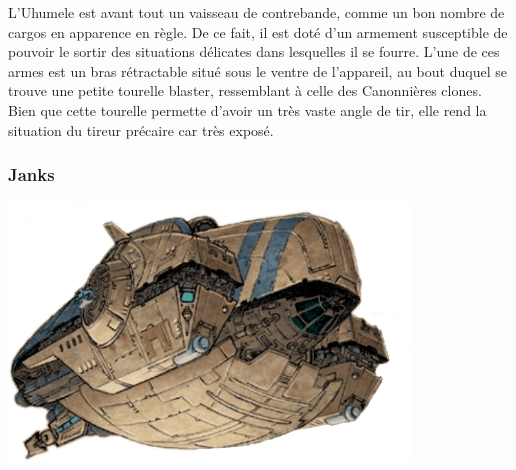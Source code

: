 L’Uhumele est avant tout un vaisseau de contrebande, comme un bon nombre de cargos en apparence en règle. De ce fait, il est doté d’un armement susceptible de pouvoir le sortir des situations délicates dans lesquelles il se fourre. L’une de ces armes est un bras rétractable situé sous le ventre de l’appareil, au bout duquel se trouve une petite tourelle blaster, ressemblant à celle des Canonnières clones. Bien que cette tourelle permette d’avoir un très vaste angle de tir, elle rend la situation du tireur précaire car très exposé. 

\subsubsection{Janks}\label{sec:uhumele-janks}
\hspace{12em}
\includegraphics[width=0.8\textwidth]{_img/uhumele.png}


